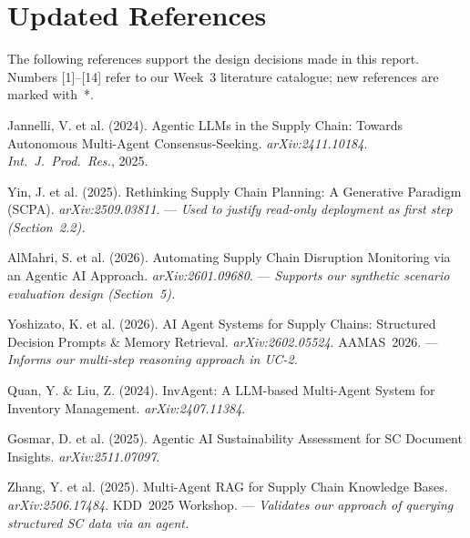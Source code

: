 \documentclass[11pt,a4paper]{article}
\begin{document}
\section{Updated References}

The following references support the design decisions made in this report. Numbers [1]--[14] refer to our Week~3 literature catalogue; new references are marked with~*.

\vspace{0.5em}

\renewcommand{\arraystretch}{1.25}
\begin{enumerate}[leftmargin=2em, itemsep=0.3em, label={[\arabic*]}]
    \item Jannelli, V. et al. (2024). Agentic LLMs in the Supply Chain: Towards Autonomous Multi-Agent Consensus-Seeking. \textit{arXiv:2411.10184}. \textit{Int.\ J.\ Prod.\ Res.}, 2025.

    \item Yin, J. et al. (2025). Rethinking Supply Chain Planning: A Generative Paradigm (SCPA). \textit{arXiv:2509.03811}. --- \textit{Used to justify read-only deployment as first step (Section~2.2).}

    \item AlMahri, S. et al. (2026). Automating Supply Chain Disruption Monitoring via an Agentic AI Approach. \textit{arXiv:2601.09680}. --- \textit{Supports our synthetic scenario evaluation design (Section~5).}

    \item Yoshizato, K. et al. (2026). AI Agent Systems for Supply Chains: Structured Decision Prompts \& Memory Retrieval. \textit{arXiv:2602.05524}. AAMAS~2026. --- \textit{Informs our multi-step reasoning approach in UC-2.}

    \item Quan, Y. \& Liu, Z. (2024). InvAgent: A LLM-based Multi-Agent System for Inventory Management. \textit{arXiv:2407.11384}.

    \item Gosmar, D. et al. (2025). Agentic AI Sustainability Assessment for SC Document Insights. \textit{arXiv:2511.07097}.

    \item Zhang, Y. et al. (2025). Multi-Agent RAG for Supply Chain Knowledge Bases. \textit{arXiv:2506.17484}. KDD~2025 Workshop. --- \textit{Validates our approach of querying structured SC data via an agent.}


\end{enumerate}
\end{document}
